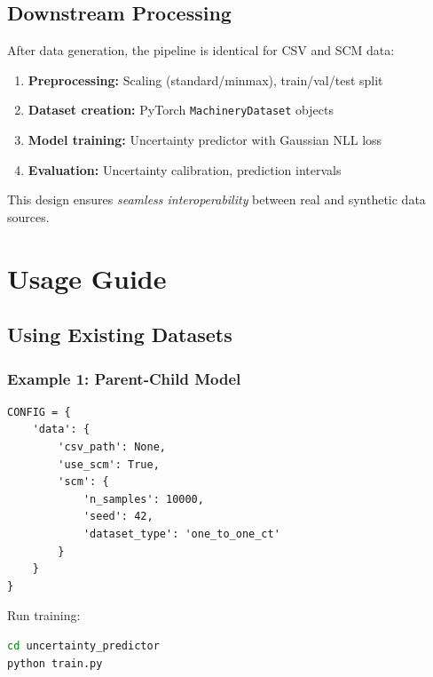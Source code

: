 \documentclass[11pt,a4paper]{article}
\begin{document}
\subsection{Downstream Processing}

After data generation, the pipeline is identical for CSV and SCM data:

\begin{enumerate}
    \item \textbf{Preprocessing:} Scaling (standard/minmax), train/val/test split
    \item \textbf{Dataset creation:} PyTorch \texttt{MachineryDataset} objects
    \item \textbf{Model training:} Uncertainty predictor with Gaussian NLL loss
    \item \textbf{Evaluation:} Uncertainty calibration, prediction intervals
\end{enumerate}

This design ensures \emph{seamless interoperability} between real and synthetic data sources.

\section{Usage Guide}

\subsection{Using Existing Datasets}

\subsubsection{Example 1: Parent-Child Model}

\begin{lstlisting}[caption={Config for One-to-One Cross-Talk}]
CONFIG = {
    'data': {
        'csv_path': None,
        'use_scm': True,
        'scm': {
            'n_samples': 10000,
            'seed': 42,
            'dataset_type': 'one_to_one_ct'
        }
    }
}
\end{lstlisting}

Run training:
\begin{lstlisting}[language=bash]
cd uncertainty_predictor
python train.py
\end{lstlisting}
\end{document}
